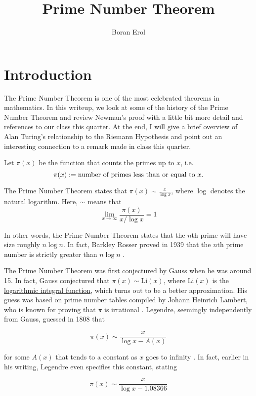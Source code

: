 \documentclass{article}
\title{Prime Number Theorem}
\author{Boran Erol}
\theoremstyle{definition}
\begin{document}
\maketitle

\section{Introduction}

The Prime Number Theorem is one of the most celebrated theorems in mathematics. In this writeup,
we look at some of the history of the Prime Number Theorem and review Newman's proof with a little bit 
more detail and references to our class this quarter. At the end,
I will give a brief overview of Alan Turing's relationship to the Riemann Hypothesis
and point out an interesting connection to a remark made in class this quarter.

Let $ \pi(x) $ be the function that counts the primes up to $ x $, i.e.\[ \pi(x) := \text{number of primes less than or equal to $ x $} .\]

The Prime Number Theorem states that $ \pi(x) \sim \frac{x}{\log x} $, where $\log $ denotes the natural logarithm.
Here, $ \sim $ means that \[ \lim_{x \to \infty} \frac{ \pi(x)}{x/ \log{x}} = 1 \]

In other words, the Prime Number Theorem states that the $n$th prime will have size roughly $ n \log n $.
In fact, Barkley Rosser proved in 1939 that the $n$th prime number is strictly greater than $ n \log n $ \cite{rosser_n-th_1939}.

The Prime Number Theorem was first conjectured by Gauss when he was around 15. In fact, 
Gauss conjectured that $ \pi(x) \sim \text{Li}(x) $, where $ \text{Li}(x) $ is the \href{https://en.wikipedia.org/wiki/Logarithmic_integral_function}{logarithmic integral function}, 
which turns out to be a better approximation. 
His guess was based on prime number tables compiled by Johann Heinrich Lambert, who is
known for proving that $ \pi $ is irrational \cite{klyve_origin_2018} \cite{noauthor_histoire_nodate}. Legendre, seemingly independently from Gauss,
guessed in 1808 that

\[ \pi(x) \sim \frac{x}{\log x - A(x)} \]

for some $ A(x) $ that tends to a constant as $ x $ goes to infinity \cite{bateman_hundred_1996}. In fact,
earlier in his writing, Legendre even specifies this constant, stating 

\[ \pi(x) \sim \frac{x}{\log x - 1.08366} \]
\end{document}
